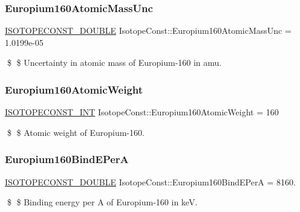 \subsubsection{\texorpdfstring{Europium160\+Atomic\+Mass\+Unc}{Europium160AtomicMassUnc}}
{\footnotesize\ttfamily \mbox{\hyperlink{group___isotope_const-_macros_ga8f45a7272ce02c0b4c65c44636ed719a}{I\+S\+O\+T\+O\+P\+E\+C\+O\+N\+S\+T\+\_\+\+D\+O\+U\+B\+LE}} Isotope\+Const\+::\+Europium160\+Atomic\+Mass\+Unc = 1.\+0199e-\/05}

\$ \$ Uncertainty in atomic mass of Europium-\/160 in amu. \mbox{\label{group___isotope_const-_europium-_eu160_gac65b755056b96d823ca21ff8f269c2b3}} 
\subsubsection{\texorpdfstring{Europium160\+Atomic\+Weight}{Europium160AtomicWeight}}
{\footnotesize\ttfamily \mbox{\hyperlink{group___isotope_const-_macros_ga5f18360b3e99483a35c32d789e62621c}{I\+S\+O\+T\+O\+P\+E\+C\+O\+N\+S\+T\+\_\+\+I\+NT}} Isotope\+Const\+::\+Europium160\+Atomic\+Weight = 160}

\$ \$ Atomic weight of Europium-\/160. \mbox{\label{group___isotope_const-_europium-_eu160_gaee0c031f480b970e56ead3f96b80203e}} 
\subsubsection{\texorpdfstring{Europium160\+Bind\+E\+PerA}{Europium160BindEPerA}}
{\footnotesize\ttfamily \mbox{\hyperlink{group___isotope_const-_macros_ga8f45a7272ce02c0b4c65c44636ed719a}{I\+S\+O\+T\+O\+P\+E\+C\+O\+N\+S\+T\+\_\+\+D\+O\+U\+B\+LE}} Isotope\+Const\+::\+Europium160\+Bind\+E\+PerA = 8160.}

\$ \$ Binding energy per A of Europium-\/160 in keV. \mbox{\label{group___isotope_const-_europium-_eu160_ga1b1e35b20db456914abada24e9bfb042}} 
